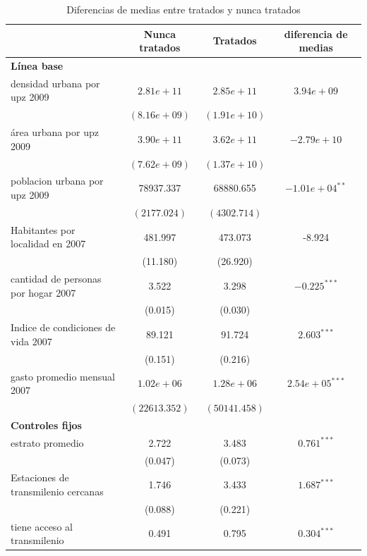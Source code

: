 \documentclass{article}
\begin{document}
\begin{table} [H]
  \centering
  \caption{Diferencias de medias entre tratados y nunca tratados}
  \label{tab:diferencias_medias}
  \begin{adjustbox}{width=\textwidth,center}
    \begin{tabular}{l c c c}
      \toprule
      \multicolumn{1}{c}{} & \multicolumn{1}{c}{\textbf{Nunca tratados}} & \multicolumn{1}{c}{\textbf{Tratados}} & \multicolumn{1}{c}{\textbf{diferencia de medias}} \\
      \midrule
       \midrule
      \multicolumn{4}{l}{\textbf{Línea base}} \\
      \midrule
      densidad urbana por upz 2009 & $2.81e+11$ & $2.85e+11$ & $3.94e+09$ \\
      & $(8.16e+09)$ & $(1.91e+10)$ & \\
      área urbana por upz 2009 & $3.90e+11$ & $3.62e+11$ & $-2.79e+10$ \\
      & $(7.62e+09)$ & $(1.37e+10)$ & \\
      poblacion urbana por upz 2009 & 78937.337 & 68880.655 & $-1.01e+04^{**}$ \\
      & $(2177.024)$ & $(4302.714)$ & \\
      Habitantes por localidad en 2007 & 481.997 & 473.073 & -8.924 \\
      & (11.180) & (26.920) & \\
      cantidad de personas por hogar 2007 & 3.522 & 3.298 & $-0.225^{***}$ \\
      & (0.015) & (0.030) & \\
      Indice de condiciones de vida 2007 & 89.121 & 91.724 & $2.603^{***}$ \\
      & (0.151) & (0.216) & \\
      gasto promedio mensual 2007 & $1.02e+06$ & $1.28e+06$ & $2.54e+05^{***}$ \\
      & $(22613.352)$ & $(50141.458)$ & \\
      \midrule
      \multicolumn{4}{l}{\textbf{Controles fijos}} \\
      \midrule
      estrato promedio & 2.722 & 3.483 & $0.761^{***}$ \\
      & (0.047) & (0.073) & \\
      Estaciones de transmilenio cercanas & 1.746 & 3.433 & $1.687^{***}$ \\
      & (0.088) & (0.221) & \\
      tiene acceso al transmilenio & 0.491 & 0.795 & $0.304^{***}$ \\

\end{tabular}
\end{adjustbox}
\end{table}
\end{document}
